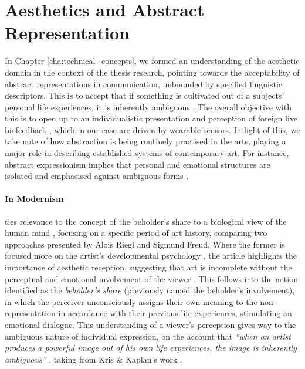 \section{Aesthetics and Abstract Representation}
\label{lit_review:abstract}

In Chapter \ref{cha:technical_concepts}, we formed an understanding of the aesthetic domain in the context of the thesis research, pointing towards the acceptability of abstract representations in communication, unbounded by specified linguistic descriptors. This is to accept that if something is cultivated out of a subjects' personal life experiences, it is inherently ambiguous \cite{kaplan_esthetic_1948}. The overall objective with this is to open up to an individualistic presentation and perception of foreign live biofeedback \cite{lux_live_2018}, which in our case are driven by wearable sensors. In light of this, we take note of how abstraction is being routinely practised in the arts, playing a major role in describing established systems of contemporary art. For instance, abstract expressionism implies that personal and emotional structures are isolated and emphasised against ambiguous forms \cite{pollock_action_2008}.

\paragraph{In Modernism}

\citeauthor{kandel_two_2013} ties relevance to the concept of the beholder's share to a biological view of the human mind \cite{kandel_two_2013}, focusing on a specific period of art history, comparing two approaches presented by Alois Riegl and Sigmund Freud. Where the former is focused more on the artist's developmental psychology \cite{freud_leonardo_1999}, the article \citeauthor{kandel_two_2013} highlights the importance of aesthetic reception, suggesting that art is incomplete without the perceptual and emotional involvement of the viewer \cite{riegl_group_1999}. This follows into the notion identified as the \textit{beholder's share} (previously named the beholder's involvement), in which the perceiver unconsciously assigns their own meaning to the non-representation in accordance with their previous life experiences, stimulating an emotional dialogue. This understanding of a viewer's perception gives way to the ambiguous nature of individual expression, on the account that \textit{``when an artist produces a powerful image out of his own life experiences, the image is inherently ambiguous''} \cite{kandel_two_2013}, taking from Kris \& Kaplan's work \cite{kaplan_esthetic_1948}.

